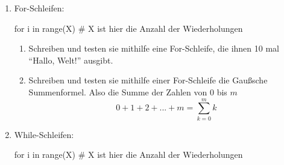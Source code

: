 \documentclass[paper=a4,fontsize=11pt]{scrartcl}%
\numberwithin{equation}{section}
\begin{document}
\begin{enumerate}
\begin{enumerate}
	\end{enumerate}
	\item For-Schleifen:
\begin{python}
for i in range(X) # X ist hier die Anzahl der Wiederholungen
\end{python}
	\begin{enumerate}
		\item Schreiben und testen sie mithilfe eine For-Schleife, die ihnen 10 mal \enquote{Hallo, Welt!} ausgibt.
		\item Schreiben und testen sie mithilfe einer For-Schleife die Gaußsche Summenformel. Also die Summe der Zahlen von $0$ bis $m$
		$$ 0 + 1 + 2 + ... + m = \sum_{k=0}^m k$$
	\end{enumerate}
\item While-Schleifen:
\begin{python}
for i in range(X) # X ist hier die Anzahl der Wiederholungen
\end{python}
\end{enumerate}
\end{document}
